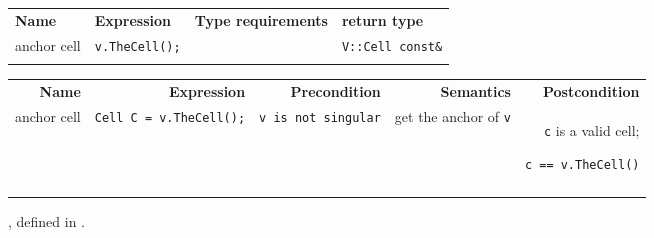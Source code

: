 \begin{tabular}{llll}
  \T \\ \hline
  \bf  Name  &\bf  Expression  &\bf  Type requirements  & \bf  return type  \\ 
  \hline
  anchor cell  &
  {\tt v.TheCell();} &
  ~ &
  {\tt V::Cell const\&} 
  \T \\   \hline \\
\end{tabular}



\begin{tabularx}{14cm}{RRRRR} 
  \T \\ \hline     
  \bf  Name     &
  \bf  Expression &
  \bf  Precondition&
  \bf  Semantics &
  \bf  Postcondition
  \\
  \hline
  anchor cell  &
  {\tt Cell C = v.TheCell();} &
  {\tt v is not singular} &
  get the anchor of {\tt v} & 
  {\tt c} is a valid cell; 
  \par
  {\tt c == v.TheCell()}
  \T \\   \hline  \\
\end{tabularx}

\W{}

, 
defined in  
.

\W{}


 ~
 ~
\\
 ~
 ~
 ~
\\
 ~
 ~
  

